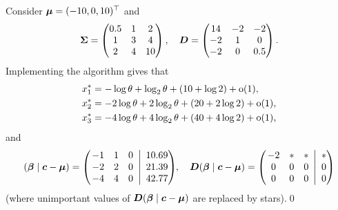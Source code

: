 \begin{example}
Consider $\bm{\mu}=(-10,0, 10)^\top$ and
\[ \bm{\Sigma} = \begin{pmatrix}
            0.5 & 1 & 2 \\
            1 & 3 & 4 \\
            2 & 4 & 10
        \end{pmatrix}, \quad
        \bm{D}  = \begin{pmatrix}
            14 & -2 & -2 \\
            -2 & 1 & 0 \\
            -2 & 0 & 0.5
        \end{pmatrix} . \]
Implementing the algorithm gives that
\begin{align*}
    x_1^* &= -\log \theta + \log_2 \theta +(10 +\log 2) + {\mathrm{o}}(1) , \\
    x_2^* &= -2 \log \theta + 2 \log_2 \theta + (20 + 2\log 2) + {\mathrm{o}}(1) , \\
    x_3^* &= -4 \log \theta + 4 \log_2 \theta + (40 + 4\log 2) + {\mathrm{o}}(1) ,
\end{align*}
and
\[
(\bm{\beta} \mid \bm{c}-\bm{\mu}) = \left(\left.\begin{matrix}
            -1 & 1 & 0\, \\
            -2 & 2 & 0\, \\
            -4 & 4 & 0\,
        \end{matrix} ~\right|~
        \begin{matrix}10.69\\21.39\\42.77\end{matrix}\right)\negmedspace ,\quad
    \bm{D} (\bm{\beta} \mid \bm{c}-\bm{\mu}) = \left(\left.\begin{matrix}
            -2 & * & *\, \\
            0 & 0 & 0\, \\
            0 & 0 & 0\,
    \end{matrix} ~\right|~
    \begin{matrix}*\\0\\0\end{matrix}\right)
\]
(where unimportant values of $\bm{D} (\bm{\beta} \mid \bm{c}-\bm{\mu})$ are replaced by
stars).\qed
\end{example}


